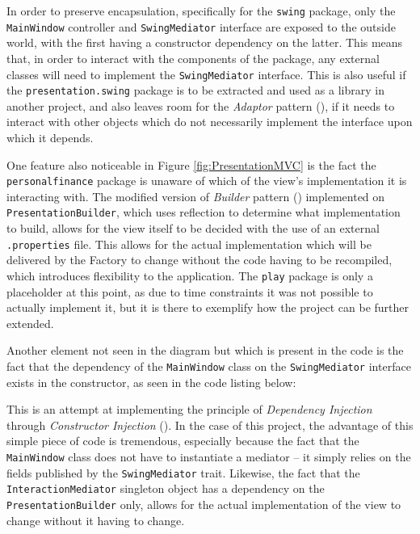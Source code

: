 \begin{sloppypar}
  In order to preserve encapsulation, specifically for the \texttt{swing}
  package, only the \texttt{MainWindow} controller and \texttt{SwingMediator}
  interface are exposed to the outside world, with the first having a
  constructor dependency on the latter. This means that, in order to interact
  with the components of the package, any external classes will need to
  implement the \texttt{SwingMediator} interface. This is also useful if the
  \texttt{presentation.swing} package is to be extracted and used as a library
  in another project, and also leaves room for the \emph{Adaptor} pattern
  (\cite[][p.~139]{gamma1995design}), if it needs to interact with other
  objects which do not necessarily implement the interface upon which it
  depends.
\end{sloppypar}

One feature also noticeable in Figure \ref{fig:PresentationMVC} is the fact the
\texttt{personalfinance} package is unaware of which of the view's
implementation it is interacting with. The modified version of 
\emph{Builder} pattern (\cite[][pp.~37-38]{lokke2009scala}) implemented on
\texttt{PresentationBuilder}, which uses reflection to determine what
implementation to build, allows for the view itself to be decided with the use
of an external \texttt{.properties} file. This allows for the actual
implementation which will be delivered by the Factory to change without the
code having to be recompiled, which introduces flexibility to the application.
The \texttt{play} package is only a placeholder at this point, as due to time
constraints it was not possible to actually implement it, but it is there to
exemplify how the project can be further extended.

Another element not seen in the diagram but which is present in the code is the
fact that the dependency of the \texttt{MainWindow} class on the
\texttt{SwingMediator} interface exists in the constructor, as seen in the code
listing below:
{
  \small
  
}

This is an attempt at implementing the principle of \emph{Dependency Injection}
through \emph{Constructor Injection} (\cite[][]{fowler2004inversion}). In the
case of this project, the advantage of this simple piece of code is tremendous,
especially because the fact that the \texttt{MainWindow} class does not have to
instantiate a mediator -- it simply relies on the fields published by the
\texttt{SwingMediator} trait. Likewise, the fact that the
\texttt{InteractionMediator} singleton object has a dependency on the
\texttt{PresentationBuilder} only, allows for the actual implementation of the
view to change without it having to change.

